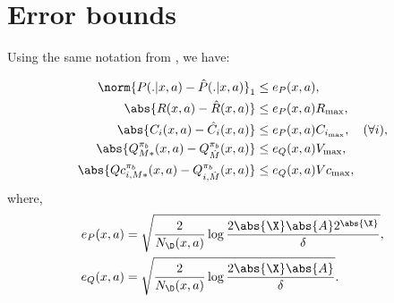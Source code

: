 \section{Error bounds}
\label{app:err-bounds}

Using the same notation from \cite{nadjahi2019safe}, we have:

\begin{align}
    \norm{P(.|x,a) - \hat{P}(.|x,a)}_{1} &\leq e_P(x,a),  \label{eq:eP}
    \\ \abs{R(x,a) - \hat{R}(x,a)} &\leq e_P(x,a) R_{\max}, \label{eq:eR}
    \\ \abs{C_i(x,a) - \hat{C_{i}}(x,a)} &\leq e_P(x,a) C_{i_{\max}}, \quad (\forall i),   \label{eq:eC}
    \\ \abs{Q^{\pi_b}_{M*}(x,a) - Q^{\pi_b}_{\hat{M}}(x,a)} &\leq e_Q(x,a) V_{\max},  \label{eq:eQ}
    \\ \abs{{Qc}^{\pi_b}_{i, M*}(x,a) - Q^{\pi_b}_{i, \hat{M}}(x,a)} &\leq e_Q(x,a) {Vc}_{\max},  \label{eq:eQc}
\end{align}
where,
\begin{align}
    e_P(x,a) &= \sqrt{\frac{2}{N_{\D}(x,a)} \log\frac{2 \abs{\X}\abs{A}2^{\abs{\X}}}{\delta}}, 
    \\ e_Q(x,a) &= \sqrt{\frac{2}{N_{\D}(x,a)} \log\frac{2 \abs{\X}\abs{A}}{\delta}}.
\end{align}
